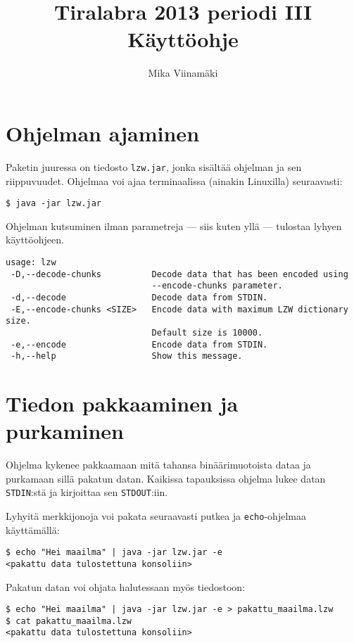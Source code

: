 \documentclass{article}
\begin{document}
\title{Tiralabra 2013 periodi III \\ Käyttöohje}
\author{Mika Viinamäki}
\maketitle

\section{Ohjelman ajaminen}

Paketin juuressa on tiedosto \verb+lzw.jar+, jonka sisältää ohjelman ja sen riippuvuudet. Ohjelmaa voi ajaa terminaalissa (ainakin Linuxilla) seuraavasti:

\begin{verbatim}
$ java -jar lzw.jar
\end{verbatim}

Ohjelman kutsuminen ilman parametreja --- siis kuten yllä --- tulostaa lyhyen käyttöohjeen.

\begin{verbatim}
usage: lzw
 -D,--decode-chunks          Decode data that has been encoded using
                             --encode-chunks parameter.
 -d,--decode                 Decode data from STDIN.
 -E,--encode-chunks <SIZE>   Encode data with maximum LZW dictionary size.
                             Default size is 10000.
 -e,--encode                 Encode data from STDIN.
 -h,--help                   Show this message.
\end{verbatim}

\section{Tiedon pakkaaminen ja purkaminen}
Ohjelma kykenee pakkaamaan mitä tahansa binäärimuotoista dataa ja purkamaan sillä pakatun datan. Kaikissa tapauksissa ohjelma lukee datan \verb+STDIN+:stä ja kirjoittaa sen \verb+STDOUT+:iin.

Lyhyitä merkkijonoja voi pakata seuraavasti putkea ja \verb+echo+-ohjelmaa käyttämällä:
\begin{verbatim}
$ echo "Hei maailma" | java -jar lzw.jar -e
<pakattu data tulostettuna konsoliin>
\end{verbatim}

\begin{samepage}
Pakatun datan voi ohjata halutessaan myös tiedostoon:
\begin{verbatim}
$ echo "Hei maailma" | java -jar lzw.jar -e > pakattu_maailma.lzw
$ cat pakattu_maailma.lzw
<pakattu data tulostettuna konsoliin>
\end{verbatim}
\end{samepage}
\end{document}
